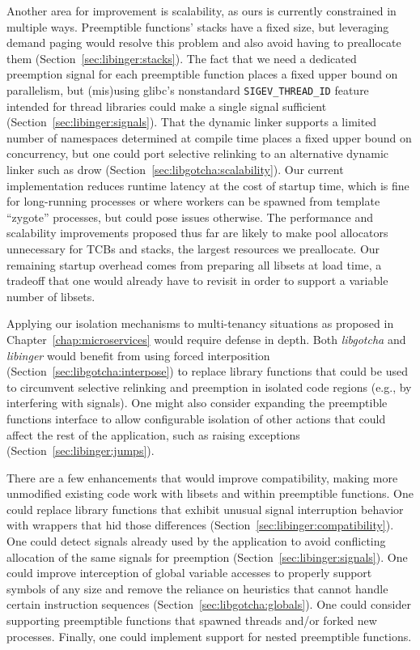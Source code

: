 Another area for improvement is scalability, as ours is currently constrained in
multiple ways.  Preemptible functions' stacks have a fixed size, but leveraging
demand paging would resolve this problem and also avoid having to preallocate them
(Section~\ref{sec:libinger:stacks}).  The fact that we need a dedicated preemption
signal for each preemptible function places a fixed upper bound on parallelism, but
(mis)using glibc's nonstandard \texttt{SIGEV\_THREAD\_ID} feature intended for thread
libraries could make a single signal sufficient (Section~\ref{sec:libinger:signals}).
That the dynamic linker supports a limited number of namespaces determined at compile
time places a fixed upper bound on concurrency, but one could port selective
relinking to an alternative dynamic linker such as drow
(Section~\ref{sec:libgotcha:scalability}).  Our current implementation reduces
runtime latency at the cost of startup time, which is fine for long-running processes
or where workers can be spawned from template ``zygote'' processes, but could pose
issues otherwise.  The performance and scalability improvements proposed thus far are
likely to make pool allocators unnecessary for TCBs and stacks, the largest resources
we preallocate.  Our remaining startup overhead comes from preparing all libsets at
load time, a tradeoff that one would already have to revisit in order to support a
variable number of libsets.

Applying our isolation mechanisms to multi-tenancy situations as proposed in
Chapter~\ref{chap:microservices} would require defense in depth.  Both
\textit{libgotcha} and \textit{libinger} would benefit from using forced
interposition (Section~\ref{sec:libgotcha:interpose}) to replace library functions
that could be used to circumvent selective relinking and preemption in isolated code
regions (e.g., by interfering with signals).  One might also consider expanding the
preemptible functions interface to allow configurable isolation of other actions that
could affect the rest of the application, such as raising exceptions
(Section~\ref{sec:libinger:jumps}).

There are a few enhancements that would improve compatibility, making more unmodified
existing code work with libsets and within preemptible functions.  One could replace
library functions that exhibit unusual signal interruption behavior with wrappers
that hid those differences (Section~\ref{sec:libinger:compatibility}).  One could
detect signals already used by the application to avoid conflicting allocation of the
same signals for preemption (Section~\ref{sec:libinger:signals}).  One could improve
interception of global variable accesses to properly support symbols of any size and
remove the reliance on heuristics that cannot handle certain instruction sequences
(Section~\ref{sec:libgotcha:globals}).  One could consider supporting preemptible
functions that spawned threads and/or forked new processes.  Finally, one could
implement support for nested preemptible functions.

